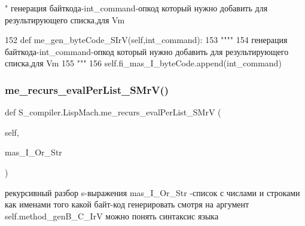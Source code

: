 \begin{DoxyVerb}"
генерация байткода-int_command-опкод который нужно добавить для результирующего списка,для Vm
\end{DoxyVerb}
 
\begin{DoxyCode}
152  \textcolor{keyword}{def }me\_gen\_byteCode\_SIrV(self,int\_command):
153      \textcolor{stringliteral}{""""}
154 \textcolor{stringliteral}{          генерация байткода-int\_command-опкод который нужно добавить для результирующего списка,для Vm}
155 \textcolor{stringliteral}{     """}     
156      self.fi\_mas\_I\_byteCode.append(int\_command)
\end{DoxyCode}
\mbox{\label{class_s__compiler_1_1_lisp_mach_aa1cda09961d2dfad40a4afe460a280fb}} 
\subsubsection{\texorpdfstring{me\+\_\+recurs\+\_\+eval\+Per\+List\+\_\+\+S\+Mr\+V()}{me\_recurs\_evalPerList\_SMrV()}}
{\footnotesize\ttfamily def S\+\_\+compiler.\+Lisp\+Mach.\+me\+\_\+recurs\+\_\+eval\+Per\+List\+\_\+\+S\+MrV (\begin{DoxyParamCaption}\item[{}]{self,  }\item[{}]{mas\+\_\+\+I\+\_\+\+Or\+\_\+\+Str }\end{DoxyParamCaption})}

\begin{DoxyVerb} рекурсивный разбор s-выражения mas_I_Or_Str -список с числами и строками 
 как именами того какой байт-код генерировать
 смотря на аргумент self.method_genB_C_IrV можно понять синтаксис языка 
\end{DoxyVerb}
 
